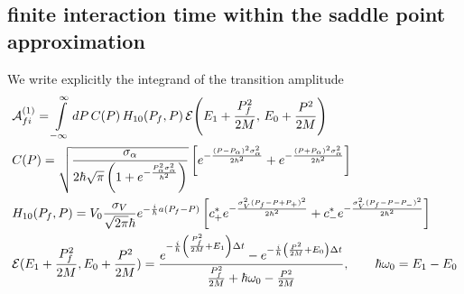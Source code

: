 \subsection{finite interaction time within the saddle point approximation}\label{sec:tls-one-absorber-saddle}

We write explicitly the integrand of the transition amplitude
\begin{align}
     & \mathcal A_{fi}^{(1)} = \int\limits_{-\infty}^{\infty}dP\, C(P)\, H_{10}(P_f,P)\, \mathcal E\!\left(E_1+\frac{P_f^2}{2M},\,E_0+\frac{P^2}{2M}\right)       \label{eq:tls-one-absorber-amplitude-saddle}
    \\
     & C(P) = \sqrt{\frac{\sigma_\alpha}{2\hbar\sqrt{\pi}\left(1+e^{-\frac{P_\alpha^2\sigma_\alpha^2}{\hbar^2}}\right)}}\left[ e^{-\frac{(P-P_\alpha)^2\sigma_\alpha^2}{2\hbar^2}} + e^{-\frac{(P+P_\alpha)^2\sigma_\alpha^2}{2\hbar^2}} \right]\nonumber                     \\
     & H_{10}(P_f,P) = V_0\frac{\sigma_V}{\sqrt{2\pi}\hbar}e^{-\frac{i}{\hbar}a(P_f-P)}\left[c_+^*e^{-\frac{\sigma_V^2(P_f-P+P_+)^2}{2\hbar^2}}+c_-^*e^{-\frac{\sigma_V^2(P_f-P-P_-)^2}{2\hbar^2}}\right]\nonumber                                                                \\
     & {\cal E}(E_1+\frac{P_f^2}{2M},E_0+\frac{P^2}{2M}) = \frac{e^{-\frac{i}{\hbar}\left(\frac{P_f^2}{2M}+E_1\right)\Delta t}-e^{-\frac{i}{\hbar}{\left(\frac{P^2}{2M}+E_0\right)}\Delta t} }{\frac{P_f^2}{2M}+\hbar\omega_0- \frac{P^2}{2M}},\qquad \hbar\omega_0 = E_1-E_0
\end{align}

